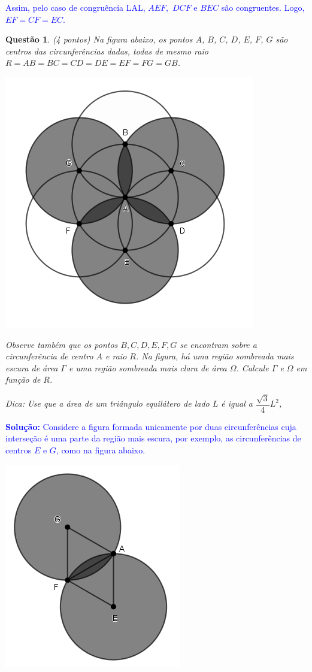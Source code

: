\documentclass[oneside,a4paper,12pt]{article}
\theoremstyle{Colorido}
\theoremstyle{solu}
\theoremstyle{dotlessP}
\newcommand{\solucao}[1]{\textcolor{blue}{\textbf{Solução:} #1}}
\newtheorem{sol}{Questão}
\begin{document}
\textcolor{blue}{Assim, pelo caso de congruência LAL, $AEF,$ $DCF$ e $BEC$ são congruentes. Logo, $EF = CF = EC.$}
\newpage
	\begin{sol}
\textit{(4 pontos)} \newline \newline
Na figura abaixo, os pontos $A$, $B$, $C$, $D$, $E$, $F$, $G$ são centros das circunferências dadas, todas de mesmo raio $R=AB=BC=CD=DE=EF=FG=GB$.
\begin{center}
\includegraphics[scale=2.5]{Provas e Avaliações/Figuras avaliações/10avaliacaociclo3.png}
\end{center}
Observe também que os pontos $B,C,D,E,F,G$ se encontram sobre a circunferência de centro $A$ e raio $R$. Na figura, há uma região sombreada mais escura de área $\Gamma$ e uma região sombreada mais clara de área $\Omega$. Calcule $\Gamma$ e $\Omega$ em função de $R$.

\textsf{Dica:}  Use que a área de um triângulo equilátero de lado $L$ é igual a $\dfrac{\sqrt{3}}{4} L^2$,
\end{sol}
\solucao{Considere a figura formada unicamente por duas circunferências cuja interseção é uma parte da região mais escura, por exemplo, as circunferências de centros $E$ e $G$, como na figura abaixo.}
\begin{center}
\includegraphics[scale=2.5]{Provas e Avaliações/Figuras avaliações/11avaliacaociclo3.png}
\end{center}
\end{document}
